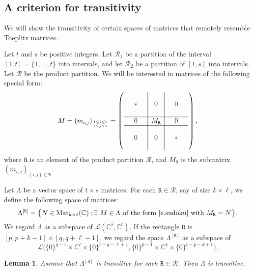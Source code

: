 \documentclass[10pt, a4paper]{amsart}
\theoremstyle{plain}
\newtheorem{lemma}{Lemma}[section]
\theoremstyle{definition}
\theoremstyle{remark}
\theoremstyle{note}
\numberwithin{equation}{section}
\begin{document}
\subsection{A criterion for transitivity} \label{ss.sudoku}

We will show the transitivity of 
certain spaces of matrices that remotely resemble Toeplitz matrices.  

Let $t$ and $s$ be positive integers.
Let $\mathcal{R}_1$ be a partition of the interval $[1,t] = \{1, \ldots, t\}$ into intervals,
and let $\mathcal{R}_2$ be a partition of $[1,s]$ into intervals.
Let $\mathcal{R}$ be the product partition.
We will be interested in matrices of the following special form:
\begin{equation}\label{e.sudoku}
M=(m_{i,j})_{1\leq i\leq  t \atop 1\leq j\leq s }=
\left(
\begin{array}{ccc|c|ccc}
&   & &   &  &   & \\
& * & & 0 &  & 0 & \\
&   & &   &  &   & \\
\hline 
& 0 & &M_{\mathtt{R}} & & 0 & \\
\hline
&   & &   &  &   & \\
& 0 & & 0 &  & * & \\
&   & &   &  &   & 
\end{array}
\right),
\end{equation}
where ${\mathtt{R}}$ is an element of the product partition $\mathcal{R}$, and $M_{\mathtt{R}}$ is the submatrix 
$(m_{i,j})_{(i,j)\in {\mathtt{R}}}$. 

Let $\Lambda$ be a vector space of $t \times s$ matrices.
For each ${\mathtt{R}} \in \mathcal{R}$, say of size $k \times \ell$, 
we define the following space of matrices:
\begin{equation}\label{e.sudoku space}
\Lambda^{[{\mathtt{R}}]} = \big\{
N \in {\mathrm{Mat}}_{k \times \ell}({\mathbb{C}}) \; ;
\exists \ M \in \Lambda
\text{ of the form \eqref{e.sudoku} with $M_{\mathtt{R}} = N$} 
\big\}.
\end{equation}
We regard $\Lambda$ as a subspace of $\mathcal{L}({\mathbb{C}}^s,{\mathbb{C}}^t)$.
If the rectangle ${\mathtt{R}}$ is $[p, p+k-1] \times [q, q+\ell-1]$,
we regard the space $\Lambda^{[{\mathtt{R}}]}$ as a subspace of  
$$
\mathcal{L} \big( \{0\}^{q-1} \times {\mathbb{C}}^\ell \times \{0\}^{t-q-\ell+1}, \{0\}^{p-1} \times {\mathbb{C}}^k \times \{0\}^{t-p-k+1} \big).
$$ 

\begin{lemma}\label{l.sudoku}
Assume that $\Lambda^{[{\mathtt{R}}]}$ is transitive for each ${\mathtt{R}} \in \mathcal{R}$.
Then $\Lambda$ is transitive.
\end{lemma}
\end{document}

